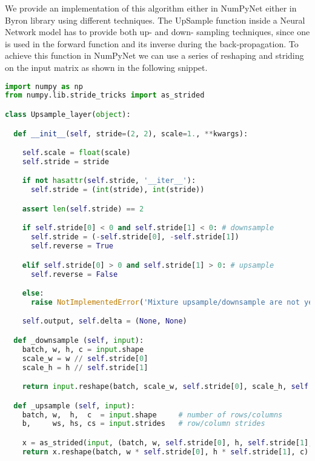 \documentclass{standalone}
\begin{document}
We provide an implementation of this algorithm either in \textsf{NumPyNet} either in \textsf{Byron} library using different techniques.
The UpSample function inside a Neural Network model has to provide both up- and down- sampling techniques, since one is used in the forward function and its inverse during the back-propagation.
To achieve this function in \textsf{NumPyNet} we can use a series of reshaping and striding on the input matrix as shown in the following snippet.

\lstset{style=snippet}
\begin{lstlisting}[language=Python, caption=NumPyNet version of Upsampling function, label=code:py_upsample]
import numpy as np
from numpy.lib.stride_tricks import as_strided

class Upsample_layer(object):

  def __init__(self, stride=(2, 2), scale=1., **kwargs):

    self.scale = float(scale)
    self.stride = stride

    if not hasattr(self.stride, '__iter__'):
      self.stride = (int(stride), int(stride))

    assert len(self.stride) == 2

    if self.stride[0] < 0 and self.stride[1] < 0: # downsample
      self.stride = (-self.stride[0], -self.stride[1])
      self.reverse = True

    elif self.stride[0] > 0 and self.stride[1] > 0: # upsample
      self.reverse = False

    else:
      raise NotImplementedError('Mixture upsample/downsample are not yet implemented')

    self.output, self.delta = (None, None)

  def _downsample (self, input):
    batch, w, h, c = input.shape
    scale_w = w // self.stride[0]
    scale_h = h // self.stride[1]

    return input.reshape(batch, scale_w, self.stride[0], scale_h, self.stride[1], c).mean(axis=(2, 4))

  def _upsample (self, input):
    batch, w,  h,  c  = input.shape     # number of rows/columns
    b,     ws, hs, cs = input.strides   # row/column strides

    x = as_strided(input, (batch, w, self.stride[0], h, self.stride[1], c), (b, ws, 0, hs, 0, cs)) # view a as larger 4D array
    return x.reshape(batch, w * self.stride[0], h * self.stride[1], c)                                     # create new 2D array


\end{lstlisting}
\end{document}
